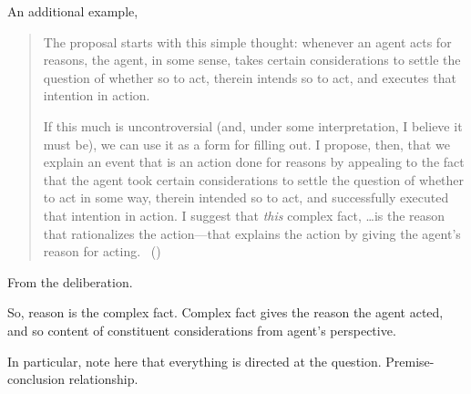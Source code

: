 \begin{note}
  An additional example, \citeauthor{Hieronymi:2011aa}
  \begin{quote}
    The proposal starts with this simple thought: whenever an agent acts for reasons, the agent, in some sense, takes certain considerations to settle the question of whether so to act, therein intends so to act, and executes that intention in action.

    If this much is uncontroversial (and, under some interpretation, I believe it must be), we can use it as a form for filling out.
    I propose, then, that we explain an event that is an action done for reasons by appealing to the fact that the agent took certain considerations to settle the question of whether to act in some way, therein intended so to act, and successfully executed that intention in action.
    I suggest that \emph{this} complex fact, \dots is the reason that rationalizes the action---that explains the action by giving the agent’s reason for acting.%
    \mbox{ }\hfill\mbox{(\citeyear[431]{Hieronymi:2011aa})}
  \end{quote}

  From the deliberation.

  So, reason is the complex fact.
  Complex fact gives the reason the agent acted, and so content of constituent considerations from agent's perspective.

  In particular, note here that everything is directed at the question.
  Premise-conclusion relationship.
\end{note}

